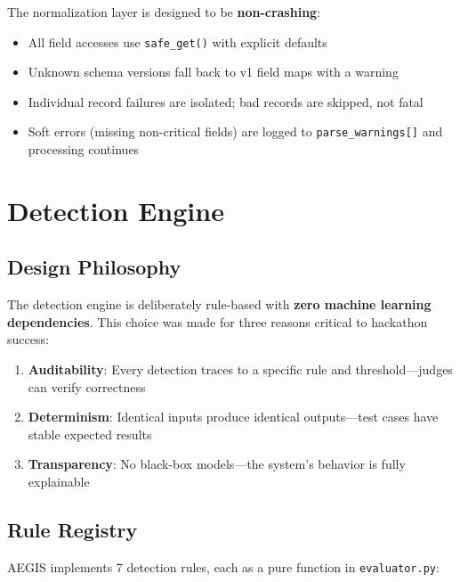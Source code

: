 \documentclass[12pt,a4paper]{article}
\begin{document}
The normalization layer is designed to be \textbf{non-crashing}:

\begin{itemize}[noitemsep]
    \item All field accesses use \texttt{safe\_get()} with explicit defaults
    \item Unknown schema versions fall back to v1 field maps with a warning
    \item Individual record failures are isolated; bad records are skipped, not fatal
    \item Soft errors (missing non-critical fields) are logged to \texttt{parse\_warnings[]} and processing continues
\end{itemize}

\section{Detection Engine}

\subsection{Design Philosophy}

The detection engine is deliberately rule-based with \textbf{zero machine learning dependencies}. This choice was made for three reasons critical to hackathon success:

\begin{enumerate}[noitemsep]
    \item \textbf{Auditability}: Every detection traces to a specific rule and threshold---judges can verify correctness
    \item \textbf{Determinism}: Identical inputs produce identical outputs---test cases have stable expected results
    \item \textbf{Transparency}: No black-box models---the system's behavior is fully explainable
\end{enumerate}

\subsection{Rule Registry}

AEGIS implements 7 detection rules, each as a pure function in \texttt{evaluator.py}:
\end{document}
